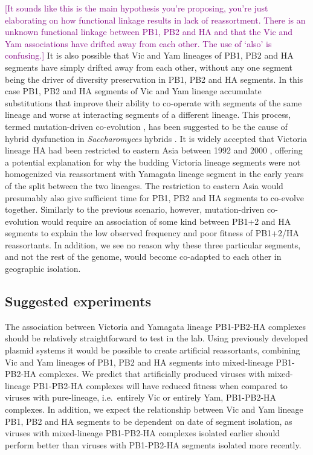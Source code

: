 \documentclass[11pt,oneside,letterpaper]{article}
\def\tbc#1{\textcolor{purple}{[#1]}}
\begin{document}
\tbc{It sounds like this is the main hypothesis you're proposing, you're just elaborating on how functional linkage results in lack of reassortment.  There is an unknown functional linkage between PB1, PB2 and HA and that the Vic and Yam associations have drifted away from each other.  The use of `also' is confusing.}
It is also possible that Vic and Yam lineages of PB1, PB2 and HA segments have simply drifted away from each other, without any one segment being the driver of diversity preservation in PB1, PB2 and HA segments.
In this case PB1, PB2 and HA segments of Vic and Yam lineage accumulate substitutions that improve their ability to co-operate with segments of the same lineage and worse at interacting segments of a different lineage.
This process, termed mutation-driven co-evolution \cite{presgraves2010}, has been suggested to be the cause of hybrid dysfunction in \textit{Saccharomyces} hybrids \cite{lee2008}.
It is widely accepted that Victoria lineage HA had been restricted to eastern Asia between 1992 and 2000 \cite{nerome1998,shaw2002}, offering a potential explanation for why the budding Victoria lineage segments were not homogenized via reassortment with Yamagata lineage segment in the early years of the split between the two lineages. 
The restriction to eastern Asia would presumably also give sufficient time for PB1, PB2 and HA segments to co-evolve together.
Similarly to the previous scenario, however, mutation-driven co-evolution would require an association of some kind between PB1+2 and HA segments to explain the low observed frequency and poor fitness of PB1+2/HA reassortants.
In addition, we see no reason why these three particular segments, and not the rest of the genome, would become co-adapted to each other in geographic isolation.

\subsection*{Suggested experiments}
The association between Victoria and Yamagata lineage PB1-PB2-HA complexes should be relatively straightforward to test in the lab.
Using previously developed plasmid systems \cite{hoffmann2002} it would be possible to create artificial reassortants, combining Vic and Yam lineages of PB1, PB2 and HA segments into mixed-lineage PB1-PB2-HA complexes.
We predict that artificially produced viruses with mixed-lineage PB1-PB2-HA complexes will have reduced fitness when compared to viruses with pure-lineage, i.e.\ entirely Vic or entirely Yam, PB1-PB2-HA complexes.
In addition, we expect the relationship between Vic and Yam lineage PB1, PB2 and HA segments to be dependent on date of segment isolation, as viruses with mixed-lineage PB1-PB2-HA complexes isolated earlier should perform better than viruses with PB1-PB2-HA segments isolated more recently.
\end{document}
